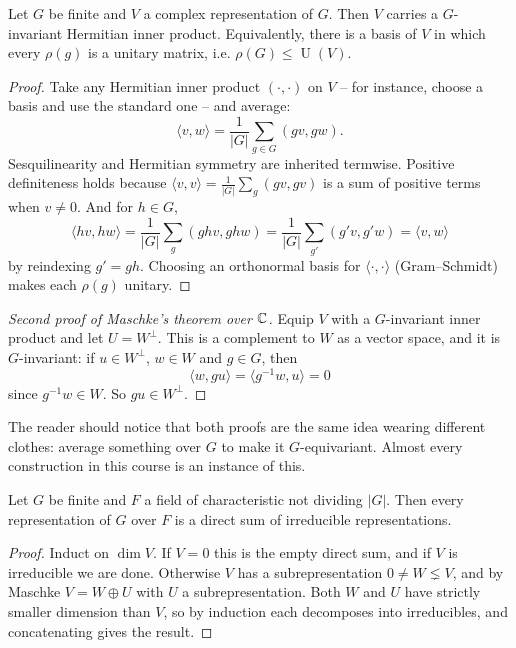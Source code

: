 \documentclass[a4paper]{scrartcl}
\newcommand{\U}{\operatorname{U}}
\newcommand{\ip}[2]{\langle #1, #2 \rangle}
\begin{document}
\begin{lemma}
	Let $G$ be finite and $V$ a complex representation of $G$. Then $V$ carries a $G$-invariant Hermitian inner product. Equivalently, there is a basis of $V$ in which every $\rho(g)$ is a unitary matrix, i.e. $\rho(G) \leq \U(V)$.
\end{lemma}
\begin{proof}
	Take any Hermitian inner product $(\cdot,\cdot)$ on $V$ -- for instance, choose a basis and use the standard one -- and average:
	$$\ip{v}{w} = \frac{1}{|G|}\sum_{g \in G} (gv, gw).$$
	Sesquilinearity and Hermitian symmetry are inherited termwise. Positive definiteness holds because $\ip{v}{v} = \frac1{|G|}\sum_g (gv,gv)$ is a sum of positive terms when $v \neq 0$. And for $h \in G$,
	$$\ip{hv}{hw} = \frac{1}{|G|}\sum_{g}(ghv, ghw) = \frac1{|G|}\sum_{g'}(g'v,g'w) = \ip{v}{w}$$
	by reindexing $g' = gh$. Choosing an orthonormal basis for $\ip\cdot\cdot$ (Gram--Schmidt) makes each $\rho(g)$ unitary.
\end{proof}

\begin{proof}[Second proof of Maschke's theorem over $\mathbb{C}$]
	Equip $V$ with a $G$-invariant inner product and let $U = W^\perp$. This is a complement to $W$ as a vector space, and it is $G$-invariant: if $u \in W^\perp$, $w \in W$ and $g \in G$, then
	$$\ip{w}{gu} = \ip{g^{-1}w}{u} = 0$$
	since $g^{-1}w \in W$. So $gu \in W^\perp$.
\end{proof}

The reader should notice that both proofs are the same idea wearing different clothes: average something over $G$ to make it $G$-equivariant. Almost every construction in this course is an instance of this.

\begin{corollary}
	Let $G$ be finite and $F$ a field of characteristic not dividing $|G|$. Then every representation of $G$ over $F$ is a direct sum of irreducible representations.
\end{corollary}
\begin{proof}
	Induct on $\dim V$. If $V = 0$ this is the empty direct sum, and if $V$ is irreducible we are done. Otherwise $V$ has a subrepresentation $0 \neq W \lneq V$, and by Maschke $V = W \oplus U$ with $U$ a subrepresentation. Both $W$ and $U$ have strictly smaller dimension than $V$, so by induction each decomposes into irreducibles, and concatenating gives the result.
\end{proof}
\end{document}
